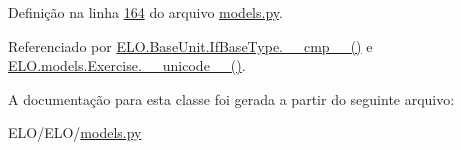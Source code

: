 Definição na linha \hyperlink{ELO_2models_8py_source_l00164}{164} do arquivo \hyperlink{ELO_2models_8py_source}{models.\-py}.



Referenciado por \hyperlink{classELO_1_1BaseUnit_1_1IfBaseType_a69c338f6f1574bd3524e9d59ebc17a7c}{E\-L\-O.\-Base\-Unit.\-If\-Base\-Type.\-\_\-\-\_\-cmp\-\_\-\-\_\-()} e \hyperlink{classELO_1_1models_1_1Exercise_af3e991e5610cec815a2c3260ec6aae0b}{E\-L\-O.\-models.\-Exercise.\-\_\-\-\_\-unicode\-\_\-\-\_\-()}.



A documentação para esta classe foi gerada a partir do seguinte arquivo\-:\begin{DoxyCompactItemize}
\item 
E\-L\-O/\-E\-L\-O/\hyperlink{ELO_2models_8py}{models.\-py}\end{DoxyCompactItemize}
